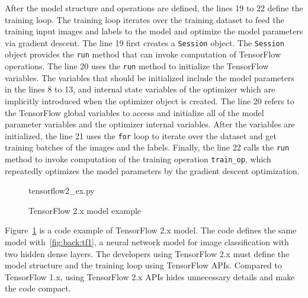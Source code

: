 After the model structure and operations are defined, 
the lines 19 to 22 define the training loop.
The training loop iterates over the training dataset to feed the training
input images and labels to the model and optimize the model parameters via
gradient descent.
The line 19 first creates a {\tt Session} object.
The {\tt Session} object provides the {\tt run} method that can invoke
computation of TensorFlow operations.
The line 20 uses the {\tt run} method to initialize the TensorFlow variables.
The variables that should be initialized
include the model parameters in the lines 8 to 13, and
internal state variables of the optimizer which are implicitly introduced
when the optimizer object is created.
The line 20 refers to the TensorFlow global variables to access and initialize
all of the model parameter variables and the optimizer internal variables.
After the variables are initialized, the line 21 uses the {\tt for} loop
to iterate over the dataset and get training batches of the images and the
labels. Finally, the line 22 calls the {\tt run} method to
invoke computation of the training operation {\tt train\_op},
which repeatedly optimizes the model parameters by the gradient descent
optimization.


\begin{figure}[ht!]

{tensorflow2_ex.py}
  \caption{TensorFlow 2.x model example}
\label{fig:back:tf2}
\end{figure}


Figure~\ref{fig:back:tf2} is a code example of TensorFlow 2.x model.
The code defines the same model with~\ref{fig:back:tf1},
a neural network model for image classification with two hidden dense layers.
The developers using TensorFlow 2.x must define the model structure and
the training loop using TensorFlow APIs.
Compared to TensorFlow 1.x, using TensorFlow 2.x APIs hides unnecessary details
and make the code compact.

